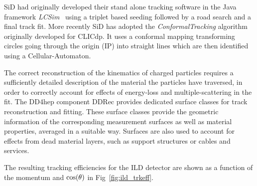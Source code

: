 SiD had originally developed their stand alone tracking software in the Java framework \emph{LCSim}~\cite{bib:LCSim}
using a triplet based seeding followed by a road search and a final track fit. More recently SiD has adopted the \emph{ConformalTracking}
algorithm originally developed for CLICdp. It uses a conformal mapping transforming circles going through the origin (IP)
into straight lines which are then identified using a Cellular-Automaton.

The correct reconstruction of the kinematics of charged particles requires a sufficiently detailed description of the material
the particles have traversed, in order to correctly account for effects of energy-loss and multiple-scattering in the fit.
The DD4hep component DDRec provides dedicated surface classes for track reconstruction and fitting. These surface classes provide the
geometric information of the corresponding measurement surfaces as well as material properties, averaged in a suitable way. Surfaces
are also used to account for effects from dead material layers, such as support structures or cables and services.


The resulting tracking efficiencies for the ILD detector are shown as a function of the momentum and
$\rm{cos}(\theta)$ in Fig~\ref{fig:ild_trkeff}.

